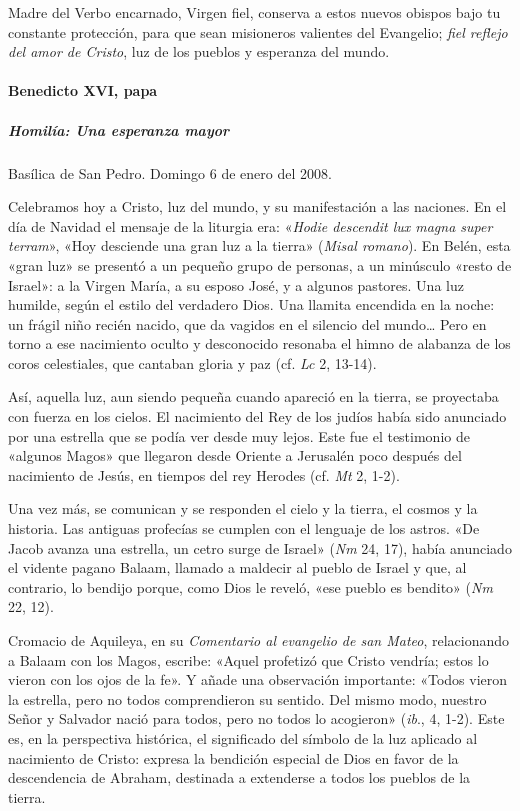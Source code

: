 \documentclass[]{article}
\let\oldparagraph\paragraph
\renewcommand{\paragraph}[1]{\oldparagraph{#1}\mbox{}}
\let\oldsubparagraph\subparagraph
\renewcommand{\subparagraph}[1]{\oldsubparagraph{#1}\mbox{}}
\begin{document}
Madre del Verbo encarnado, Virgen fiel, conserva a estos nuevos obispos
bajo tu constante protección, para que sean misioneros valientes del
Evangelio; \emph{fiel reflejo del amor de Cristo}, luz de los pueblos y
esperanza del mundo.

\paragraph{Benedicto XVI, papa}\label{benedicto-xvi-papa-9}

\subparagraph{Homilía: Una esperanza
mayor}\label{homiluxeda-una-esperanza-mayor}

Basílica de San Pedro. Domingo 6 de enero del 2008.

Celebramos hoy a Cristo, luz del mundo, y su manifestación a las
naciones. En el día de Navidad el mensaje de la liturgia era:
«\emph{Hodie descendit lux magna super terram}», «Hoy desciende una gran
luz a la tierra» (\emph{Misal romano}). En Belén, esta «gran luz» se
presentó a un pequeño grupo de personas, a un minúsculo «resto de
Israel»: a la Virgen María, a su esposo José, y a algunos pastores. Una
luz humilde, según el estilo del verdadero Dios. Una llamita encendida
en la noche: un frágil niño recién nacido, que da vagidos en el silencio
del mundo\ldots{} Pero en torno a ese nacimiento oculto y desconocido
resonaba el himno de alabanza de los coros celestiales, que cantaban
gloria y paz (cf. \emph{Lc} 2, 13-14).

Así, aquella luz, aun siendo pequeña cuando apareció en la tierra, se
proyectaba con fuerza en los cielos. El nacimiento del Rey de los judíos
había sido anunciado por una estrella que se podía ver desde muy lejos.
Este fue el testimonio de «algunos Magos» que llegaron desde Oriente a
Jerusalén poco después del nacimiento de Jesús, en tiempos del rey
Herodes (cf. \emph{Mt} 2, 1-2).

Una vez más, se comunican y se responden el cielo y la tierra, el cosmos
y la historia. Las antiguas profecías se cumplen con el lenguaje de los
astros. «De Jacob avanza una estrella, un cetro surge de Israel»
(\emph{Nm} 24, 17), había anunciado el vidente pagano Balaam, llamado a
maldecir al pueblo de Israel y que, al contrario, lo bendijo porque,
como Dios le reveló, «ese pueblo es bendito» (\emph{Nm} 22, 12).

Cromacio de Aquileya, en su \emph{Comentario al evangelio de san Mateo},
relacionando a Balaam con los Magos, escribe: «Aquel profetizó que
Cristo vendría; estos lo vieron con los ojos de la fe». Y añade una
observación importante: «Todos vieron la estrella, pero no todos
comprendieron su sentido. Del mismo modo, nuestro Señor y Salvador nació
para todos, pero no todos lo acogieron» (\emph{ib}., 4, 1-2). Este es,
en la perspectiva histórica, el significado del símbolo de la luz
aplicado al nacimiento de Cristo: expresa la bendición especial de Dios
en favor de la descendencia de Abraham, destinada a extenderse a todos
los pueblos de la tierra.
\end{document}
